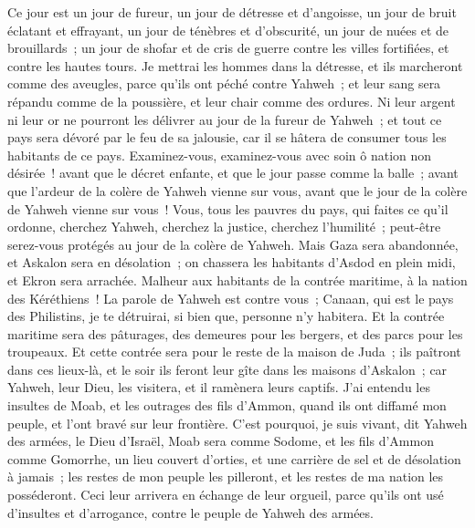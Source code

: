 \begin{multicols}{2}
Ce jour est un jour de fureur, un jour de détresse et d'angoisse, un jour de bruit éclatant et effrayant, un jour de ténèbres et d'obscurité, un jour de nuées et de brouillards~;
un jour de shofar et de cris de guerre contre les villes fortifiées, et contre les hautes tours.
Je mettrai les hommes dans la détresse, et ils marcheront comme des aveugles, parce qu'ils ont péché contre Yahweh~; et leur sang sera répandu comme de la poussière, et leur chair comme des ordures.
Ni leur argent ni leur or ne pourront les délivrer au jour de la fureur de Yahweh~; et tout ce pays sera dévoré par le feu de sa jalousie, car il se hâtera de consumer tous les habitants de ce pays.
\VerseOne{}Examinez-vous, examinez-vous avec soin ô nation non désirée~!
avant que le décret enfante, et que le jour passe comme la balle~; avant que l'ardeur de la colère de Yahweh vienne sur vous, avant que le jour de la colère de Yahweh vienne sur vous~!
Vous, tous les pauvres du pays, qui faites ce qu'il ordonne, cherchez Yahweh, cherchez la justice, cherchez l'humilité~; peut-être serez-vous protégés au jour de la colère de Yahweh.
Mais Gaza sera abandonnée, et Askalon sera en désolation~; on chassera les habitants d'Asdod en plein midi, et Ekron sera arrachée.
Malheur aux habitants de la contrée maritime, à la nation des Kéréthiens~! La parole de Yahweh est contre vous~; Canaan, qui est le pays des Philistins, je te détruirai, si bien que, personne n'y habitera.
Et la contrée maritime sera des pâturages, des demeures pour les bergers, et des parcs pour les troupeaux.
Et cette contrée sera pour le reste de la maison de Juda~; ils paîtront dans ces lieux-là, et le soir ils feront leur gîte dans les maisons d'Askalon~; car Yahweh, leur Dieu, les visitera, et il ramènera leurs captifs.
J'ai entendu les insultes de Moab, et les outrages des fils d'Ammon, quand ils ont diffamé mon peuple, et l'ont bravé sur leur frontière.
C'est pourquoi, je suis vivant, dit Yahweh des armées, le Dieu d'Israël, Moab sera comme Sodome, et les fils d'Ammon comme Gomorrhe, un lieu couvert d'orties, et une carrière de sel et de désolation à jamais~; les restes de mon peuple les pilleront, et les restes de ma nation les posséderont.
Ceci leur arrivera en échange de leur orgueil, parce qu'ils ont usé d'insultes et d'arrogance, contre le peuple de Yahweh des armées.

\end{multicols}
